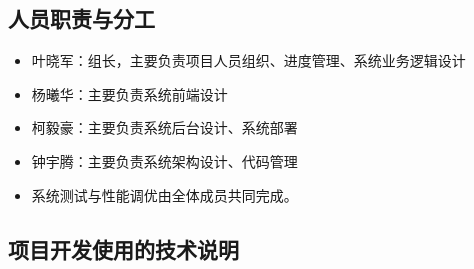 \appendix
\begin{center}
  \section{人员职责与分工}
\end{center}

\begin{itemize}
  \item 叶晓军：组长，主要负责项目人员组织、进度管理、系统业务逻辑设计
  \item 杨曦华：主要负责系统前端设计
  \item 柯毅豪：主要负责系统后台设计、系统部署
  \item 钟宇腾：主要负责系统架构设计、代码管理
  \item 系统测试与性能调优由全体成员共同完成。
\end{itemize}


\newpage

\begin{center}
  \section{项目开发使用的技术说明}
\end{center}

